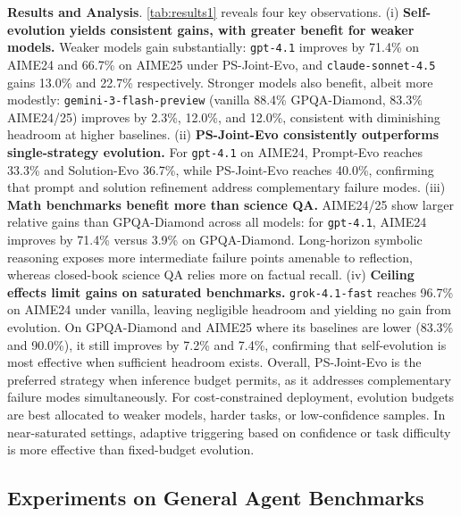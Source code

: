 \documentclass{article}
\theoremstyle{plain}
\theoremstyle{definition}
\theoremstyle{remark}
\begin{document}
\textbf{Results and Analysis}. \cref{tab:results1} reveals four key observations. (i) \textbf{Self-evolution yields consistent gains, with greater benefit for weaker models.} Weaker models gain substantially: \texttt{gpt-4.1} improves by 71.4\% on AIME24 and 66.7\% on AIME25 under PS-Joint-Evo, and \texttt{claude-sonnet-4.5} gains 13.0\% and 22.7\% respectively. Stronger models also benefit, albeit more modestly: \texttt{gemini-3-flash-preview} (vanilla 88.4\% GPQA-Diamond, 83.3\% AIME24/25) improves by 2.3\%, 12.0\%, and 12.0\%, consistent with diminishing headroom at higher baselines. (ii) \textbf{PS-Joint-Evo consistently outperforms single-strategy evolution.} For \texttt{gpt-4.1} on AIME24, Prompt-Evo reaches 33.3\% and Solution-Evo 36.7\%, while PS-Joint-Evo reaches 40.0\%, confirming that prompt and solution refinement address complementary failure modes.  (iii) \textbf{Math benchmarks benefit more than science QA.} AIME24/25 show larger relative gains than GPQA-Diamond across all models: for \texttt{gpt-4.1}, AIME24 improves by 71.4\% versus 3.9\% on GPQA-Diamond. Long-horizon symbolic reasoning exposes more intermediate failure points amenable to reflection, whereas closed-book science QA relies more on factual recall. (iv) \textbf{Ceiling effects limit gains on saturated benchmarks.} \texttt{grok-4.1-fast} reaches 96.7\% on AIME24 under vanilla, leaving negligible headroom and yielding no gain from evolution. On GPQA-Diamond and AIME25 where its baselines are lower (83.3\% and 90.0\%), it still improves by 7.2\% and 7.4\%, confirming that self-evolution is most effective when sufficient headroom exists. Overall, PS-Joint-Evo is the preferred strategy when inference budget permits, as it addresses complementary failure modes simultaneously. For cost-constrained deployment, evolution budgets are best allocated to weaker models, harder tasks, or low-confidence samples. In near-saturated settings, adaptive triggering based on confidence or task difficulty is more effective than fixed-budget evolution.

\vspace{-0.2cm}
\subsection{Experiments on General Agent Benchmarks}
\vspace{-0.2cm}
\end{document}

